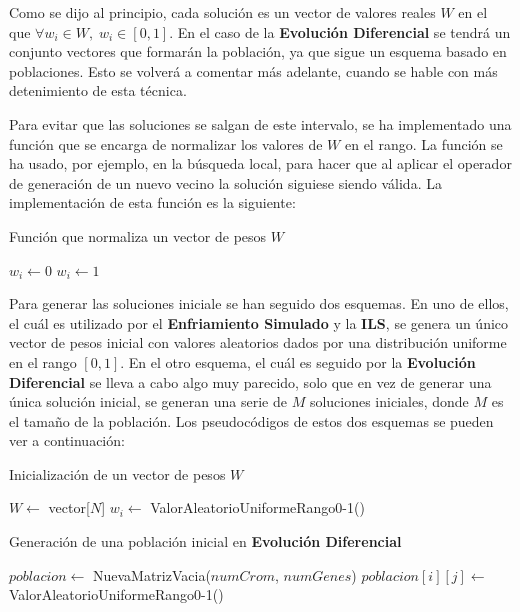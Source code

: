 \documentclass[11pt,a4paper]{article}
\begin{document}
Como se dijo al principio, cada solución es un vector de valores reales $W$ en el que $\forall w_i \in W, \; w_i \in [0, 1]$.
En el caso de la \textbf{Evolución Diferencial} se tendrá un conjunto vectores que formarán la población, ya que sigue un esquema
basado en poblaciones. Esto se volverá a comentar más adelante, cuando se hable con más detenimiento de esta técnica.

Para evitar que las soluciones se salgan de este intervalo, se ha implementado una función que se encarga de normalizar los valores
de $W$ en el rango. La función se ha usado, por ejemplo, en la búsqueda local, para hacer que al aplicar el operador
de generación de un nuevo vecino la solución siguiese siendo válida. La implementación de esta función es la siguiente:

\begin{algorithm}[H]
\caption{Función que normaliza un vector de pesos $W$}
\begin{algorithmic}[1]
		\State $w_i \gets 0$
		\State $w_i \gets 1$
	\EndIf
\EndFor
\State {}
\EndFunction
\end{algorithmic}
\end{algorithm}

Para generar las soluciones iniciale se han seguido dos esquemas. En uno de ellos, el cuál es utilizado por el \textbf{Enfriamiento
Simulado} y la \textbf{ILS}, se genera un único vector de pesos inicial con valores aleatorios dados por una distribución uniforme
en el rango $[0, 1]$. En el otro esquema, el cuál es seguido por la \textbf{Evolución Diferencial} se lleva a cabo algo muy parecido,
solo que en vez de generar una única solución inicial, se generan una serie de $M$ soluciones iniciales, donde $M$ es el tamaño de
la población. Los pseudocódigos de estos dos esquemas se pueden ver a continuación:

\begin{algorithm}[H]
\caption{Inicialización de un vector de pesos $W$}
\begin{algorithmic}[1]
\State$W \gets$ vector[$N$]
	 \State $w_i \gets$ ValorAleatorioUniformeRango0-1()
\EndFor
\State {}
\EndFunction
\end{algorithmic}
\end{algorithm}

\begin{algorithm}[H]
\caption{Generación de una población inicial en \textbf{Evolución Diferencial}}
\begin{algorithmic}[1]
\State $poblacion \gets $ NuevaMatrizVacia($numCrom$, $numGenes$)
			\State $poblacion[i][j] \gets $ ValorAleatorioUniformeRango0-1()
		\EndFor	
	\EndFor
\State {}
\EndFunction
\end{algorithmic}
\end{algorithm}
\end{document}
